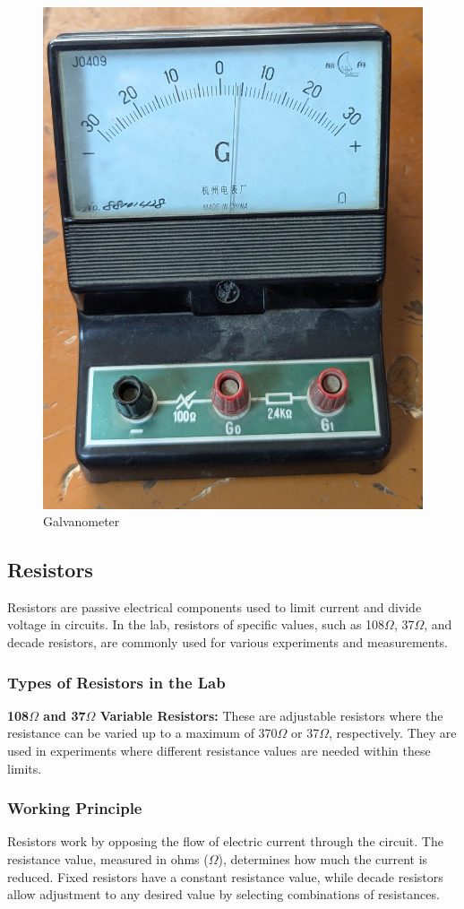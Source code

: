 \documentclass[a4paper,12pt]{article}
\begin{document}
	
\begin{figure}[H]
	\centering
	\includegraphics[width=0.45\linewidth, height=0.32 \textheight]{Images/3}
	\caption{Galvanometer}
	\label{fig:3}
\end{figure}

	\subsection{Resistors}
	Resistors are passive electrical components used to limit current and divide voltage in circuits. In the lab, resistors of specific values, such as 108$\Omega$, 37$\Omega$, and decade resistors, are commonly used for various experiments and measurements.
	
	\subsubsection{Types of Resistors in the Lab}
\textbf{108$\Omega$ and 37$\Omega$ Variable Resistors:} These are adjustable resistors where the resistance can be varied up to a maximum of 370$\Omega$ or 37$\Omega$, respectively. They are used in experiments where different resistance values are needed within these limits.\\
	
	
	\subsubsection{Working Principle}
	Resistors work by opposing the flow of electric current through the circuit. The resistance value, measured in ohms ($\Omega$), determines how much the current is reduced. Fixed resistors have a constant resistance value, while decade resistors allow adjustment to any desired value by selecting combinations of resistances.
	
\end{document}
